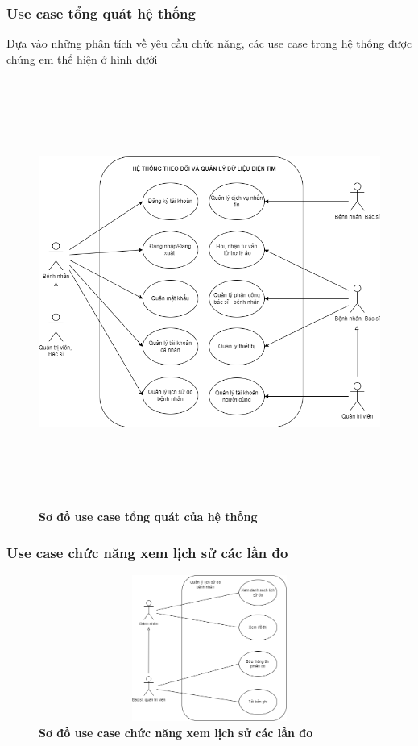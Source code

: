 \subsubsection{Use case tổng quát hệ thống}
Dựa vào những phân tích về yêu cầu chức năng, các use case trong hệ thống được chúng em thể hiện ở hình dưới 
  \begin{figure}[H]
    \centering
    \includegraphics[width=16cm,height=14cm]{Images/use_case/use_case_general.png}
    \caption[Sơ đồ use case tổng quát của hệ thống]{\bfseries \fontsize{12pt}{0pt}
    \selectfont Sơ đồ use case tổng quát của hệ thống}
    \label{use_case_general} %
  \end{figure}

\subsubsection{Use case chức năng xem lịch sử các lần đo}
  \begin{figure}[H]
    \centering
    \includegraphics[width=12cm,height=4.8cm]{Images/use_case/use_case_view_history_record.png}
    \caption[Sơ đồ use case chức năng xem lịch sử các lần đo]{\bfseries \fontsize{12pt}{0pt}
    \selectfont Sơ đồ use case chức năng xem lịch sử các lần đo}
    \label{use_case_view_history_record} %
  \end{figure}

